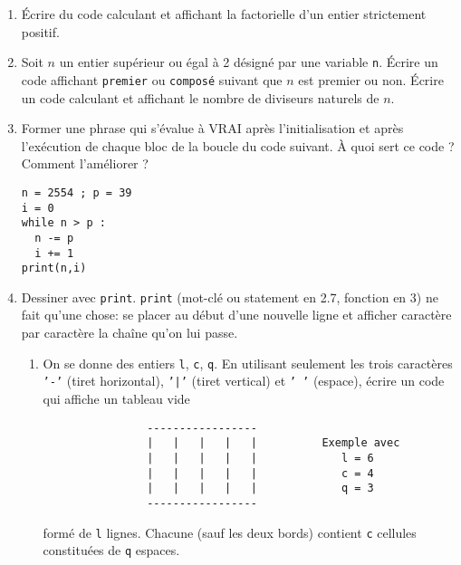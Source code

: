 \begin{enumerate}
 \item \'Ecrire du code calculant et affichant la factorielle d'un entier strictement positif.
 \item Soit $n$ un entier  supérieur ou égal à 2 désigné par une variable \verb|n|. \'Ecrire un code affichant \verb|premier| ou \verb|composé| suivant que $n$ est premier ou non. \'Ecrire un code calculant et affichant le nombre de diviseurs naturels de $n$.

 \item Former une phrase qui s'évalue à VRAI après l'initialisation et après l'exécution de chaque bloc de la boucle du code suivant. \`A quoi sert ce code ? Comment l'améliorer ?
 \begin{verbatim}
n = 2554 ; p = 39
i = 0
while n > p :
  n -= p
  i += 1
print(n,i)
 \end{verbatim}
 
\item Dessiner avec \texttt{print}.\newline
\texttt{print} (mot-clé ou statement en 2.7, fonction en 3) ne fait qu'une chose: se placer au début d'une nouvelle ligne et afficher caractère par caractère la chaîne qu'on lui passe.
\begin{enumerate}
  \item On se donne des entiers \texttt{l}, \texttt{c}, \texttt{q}. En utilisant seulement les trois caractères \texttt{'-'} (tiret horizontal), \texttt{'|'} (tiret vertical) et \texttt{' '} (espace), écrire un code qui affiche un tableau vide 
  \begin{verbatim}
                -----------------            
                |   |   |   |   |          Exemple avec
                |   |   |   |   |             l = 6
                |   |   |   |   |             c = 4
                |   |   |   |   |             q = 3   
                -----------------
  \end{verbatim}    
  formé de \texttt{l} lignes. Chacune (sauf les deux bords) contient \texttt{c} cellules constituées de \texttt{q} espaces.
  

\end{enumerate}
\end{enumerate}

